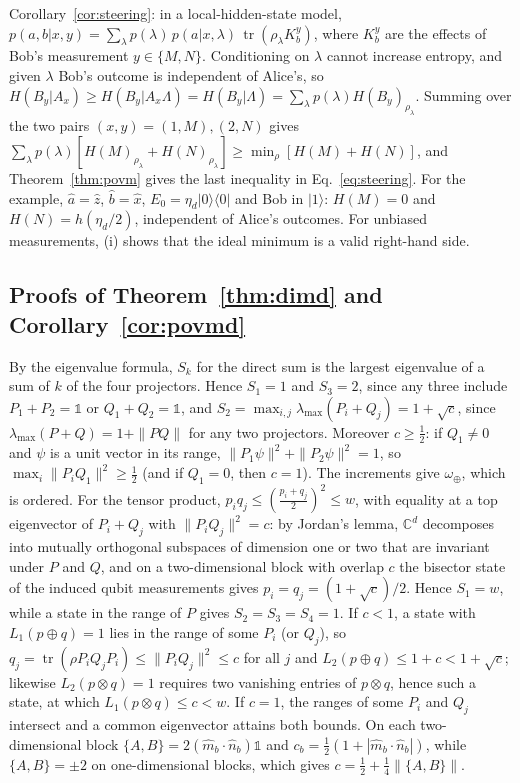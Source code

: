 \documentclass[11pt]{article}
\theoremstyle{definition}
\newcommand{\tr}{\operatorname{tr}}
\newcommand{\mhat}{\hat m}
\newcommand{\nhat}{\hat n}
\newcommand{\omplus}{\omega_{\oplus}}
\newcommand{\sqc}{\sqrt{c}}
\begin{document}
Corollary~\ref{cor:steering}: in a local-hidden-state model\cite{Uola2020},
$p(a,b|x,y)=\sum_\lambda p(\lambda)\,p(a|x,\lambda)\,\tr(\rho_\lambda K^y_b)$, where $K^y_b$ are the
effects of Bob's measurement $y\in\{M,N\}$. Conditioning on $\lambda$ cannot increase
entropy, and given $\lambda$ Bob's outcome is independent of Alice's, so
$H(B_y|A_x)\ge H(B_y|A_x\Lambda)=H(B_y|\Lambda)=\sum_\lambda p(\lambda)H(B_y)_{\rho_\lambda}$. Summing over
the two pairs $(x,y)=(1,M),(2,N)$ gives
$\sum_\lambda p(\lambda)[H(M)_{\rho_\lambda}+H(N)_{\rho_\lambda}]\ge\min_\rho[H(M)+H(N)]$, and Theorem~\ref{thm:povm}
gives the last inequality in Eq.~\eqref{eq:steering}\cite{Walborn2011,Schneeloch2013}. For the
example, $\hat a=\hat z$, $\hat b=\hat x$, $E_0=\eta_d|0\rangle\langle0|$ and Bob in $|1\rangle$:
$H(M)=0$ and $H(N)=h(\eta_d/2)$, independent of Alice's outcomes. For unbiased
measurements, (i) shows that the ideal minimum is a valid right-hand side.

\subsection*{Proofs of Theorem~\ref{thm:dimd} and Corollary~\ref{cor:povmd}}

By the eigenvalue formula, $S_k$ for the direct sum is the largest eigenvalue of
a sum of $k$ of the four projectors. Hence $S_1=1$ and $S_3=2$, since any three
include $P_1+P_2=\mathbb 1$ or $Q_1+Q_2=\mathbb 1$, and
$S_2=\max_{i,j}\lambda_{\max}(P_i+Q_j)=1+\sqc$, since $\lambda_{\max}(P+Q)=1+\|PQ\|$ for any two
projectors\cite{Halmos1969}. Moreover $c\ge\frac12$: if $Q_1\ne0$ and $\psi$ is a unit
vector in its range, $\|P_1\psi\|^2+\|P_2\psi\|^2=1$, so $\max_i\|P_iQ_1\|^2\ge\frac12$ (and if
$Q_1=0$, then $c=1$). The increments give $\omplus$, which is ordered. For the
tensor product, $p_iq_j\le(\frac{p_i+q_j}2)^2\le w$, with equality at a top eigenvector of
$P_i+Q_j$ with $\|P_iQ_j\|^2=c$: by Jordan's lemma\cite{Halmos1969,KTW2014}, $\mathbb C^d$
decomposes into mutually orthogonal subspaces of dimension one or two that are
invariant under $P$ and $Q$, and on a two-dimensional block with overlap $c$ the
bisector state of the induced qubit measurements gives $p_i=q_j=(1+\sqc)/2$. Hence
$S_1=w$, while a state in the range of $P$ gives $S_2=S_3=S_4=1$. If $c<1$, a state
with $L_1(p\oplus q)=1$ lies in the range of some $P_i$ (or $Q_j$), so
$q_j=\tr(\rho P_iQ_jP_i)\le\|P_iQ_j\|^2\le c$ for all $j$ and $L_2(p\oplus q)\le1+c<1+\sqc$;
likewise $L_2(p\otimes q)=1$ requires two vanishing entries of $p\otimes q$, hence such a
state, at which $L_1(p\otimes q)\le c<w$. If $c=1$, the ranges of some $P_i$ and $Q_j$
intersect and a common eigenvector attains both bounds. On each two-dimensional
block $\{A,B\}=2(\mhat_b\cdot\nhat_b)\mathbb 1$ and $c_b=\frac12(1+|\mhat_b\cdot\nhat_b|)$, while
$\{A,B\}=\pm2$ on one-dimensional blocks, which gives $c=\frac12+\frac14\|\{A,B\}\|$\cite{KTW2014}.
\end{document}
